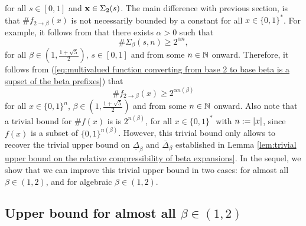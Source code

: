 for all $s \in [0,1]$ and ${\bf x} \in \Sigma_2(s)$. The main difference with previous section, is that $\#f_{2 \to \beta}(x)$ is not necessarily bounded by a constant for all $x \in \{0,1\}^\ast$. For example, it follows from \cite[Theorem 1.5]{feng2010GrowthRatebetaexpansions} that there exists $\alpha > 0$ such that 
\begin{equation}
    \# \Sigma_{\beta}(s,n) \geq 2^{\alpha n},
\end{equation}
for all $\beta \in \left(1,\frac{1+\sqrt{5}}{2}\right)$, $s \in [0,1]$ and from some $n \in \mathbb{N}$ onward. Therefore, it follows from (\ref{eq:multivalued function converting from base 2 to base beta is a supset of the beta prefixes}) that
\begin{equation}
    \#f_{2 \to \beta}(x) \geq 2^{\alpha n(\beta)}
\end{equation}
for all $x \in \{0,1\}^n$, $\beta \in \left(1,\frac{1+\sqrt{5}}{2}\right)$ and from some $n \in \mathbb{N}$ onward. Also note that a trivial bound for $\#f(x)$ is is $2^{n(\beta)}$, for all $x \in \{0,1\}^\ast$ with $n := \left| x \right|$, since $f(x)$ is a subset of $\{0,1\}^{n(\beta)}$. However, this trivial bound only allows to recover the trivial upper bound on $\underline \Delta_\beta$ and $\bar \Delta_\beta$ established in Lemma \ref{lem:trivial upper bound on the relative compressibility of beta expansions}. In the sequel, we show that we can improve this trivial upper bound in two cases: for almost all $\beta \in (1,2)$, and for algebraic $\beta \in (1,2)$.


\subsection{\texorpdfstring{Upper bound for almost all $\beta \in (1,2)$}{}}

